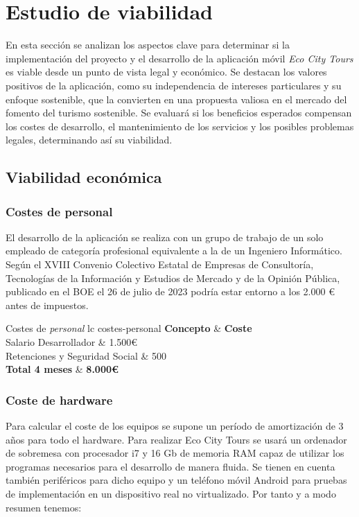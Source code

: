 \section{Estudio de viabilidad}
En esta sección se analizan los aspectos clave para determinar si la implementación del proyecto y el desarrollo de la aplicación móvil \textit{Eco City Tours} es viable desde un punto de vista legal y económico. Se destacan los valores positivos de la aplicación, como su independencia de intereses particulares y su enfoque sostenible, que la convierten en una propuesta valiosa en el mercado del fomento del turismo sostenible. Se evaluará si los beneficios esperados compensan los costes de desarrollo, el mantenimiento de los servicios y los posibles problemas legales, determinando así su viabilidad.
\subsection{Viabilidad económica}
\subsubsection{Costes de personal}
El desarrollo de la aplicación se realiza con un grupo de trabajo de un solo empleado de categoría profesional equivalente a la de un Ingeniero Informático. Según el XVIII Convenio Colectivo Estatal de Empresas de Consultoría, Tecnologías de la Información y Estudios de Mercado y de la Opinión Pública, publicado en el BOE el 26 de julio de 2023 \cite{boe2023_consultoria} podría estar entorno a los 2.000 € antes de impuestos.

\tablaSmallSinColores
{Costes de \textit{personal}} %
{lc} %
{costes-personal} %
{%
	\textbf{Concepto} & \textbf{Coste} \\ %
}
{%
	Salario Desarrollador & 1.500€  \\ 
	Retenciones y Seguridad Social & 500 \\
	\midrule
	\textbf{Total 4 meses} & \textbf{8.000€} \\ 
}

\subsubsection{Coste de hardware}
Para calcular el coste de los equipos se supone un período de amortización de 3 años para todo el hardware. Para realizar Eco City Tours se usará un ordenador de sobremesa con procesador i7 y 16 Gb de memoria RAM capaz de utilizar los programas necesarios para el desarrollo de manera fluida. Se tienen en cuenta también periféricos para dicho equipo y un teléfono móvil Android para pruebas de implementación en un dispositivo real no virtualizado. Por tanto y a modo resumen tenemos:


